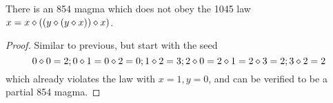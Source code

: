 \begin{corollary}  There is an 854 magma which does not obey the 1045 law $x = x \diamond ((y \diamond (y \diamond x)) \diamond x)$.
\end{corollary}

\begin{proof} Similar to previous, but start with the seed
$$ 0 \diamond 0 = 2; 0 \diamond 1 = 0 \diamond 2 = 0; 1 \diamond 2 = 3; 2 \diamond 0 = 2 \diamond 1 = 2 \diamond 3 = 2; 3 \diamond 2 = 2$$
which already violates the law with $x=1,y=0$, and can be verified to be a partial 854 magma.
\end{proof}
